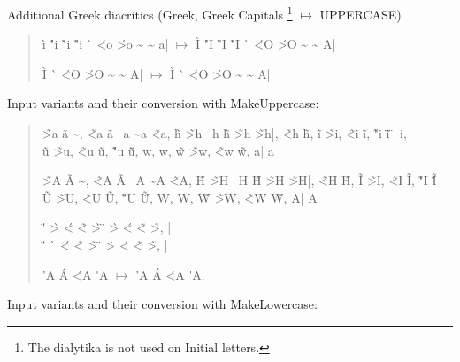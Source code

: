 \documentclass{article}
\newcommand{\LGR}{\fontencoding{LGR}\selectfont}
\newcommand{\Latin}{\fontencoding{\encodingdefault}\selectfont}
\begin{document}
Additional Greek diacritics
(Greek, Greek Capitals%
\footnote{The dialytika is not used on Initial letters.} %
$\mapsto$ UPPERCASE)

\begin{quote}
  \LGR
    \<\`{i} \'"i \`"i \~"i \` \'<{o}  \'>{o} \~ \~ a|
  $\mapsto$ \MakeUppercase{%
    \<\`{i} \'"i \`"i \~"i \` \'<{o}  \'>{o} \~ \~ a|
  }

    \<\`{I} \` \'<{O}  \'>{O} \~ \~ A|
  $\mapsto$ \MakeUppercase{%
    \<\`{I} \` \'<{O}  \'>{O} \~ \~ A|
  }
\end{quote}

\Latin Input variants and their conversion with MakeUppercase:%

\begin{quote}
\LGR

\~>a \>\~a \~, \~<a \<\~a \<~a \~\<a \~<a,
\>\~{h} \~>h \>~h \>\~h \~>h \~>h|, \~<h \<\~h,
\>\~i \~>i, \~<i \<\~i, \~"i \"\~i \"~i,\\
\>\~u \~>u, \~<u \<\~u, \~"u \"\~u,
\>w, \<w, \>\~w \~>w, \~<w \<\~w,
a| a\ypogegrammeni{}

\MakeUppercase{
\~>a \>\~a \~, \~<a \<\~a \<~a \~\<a \~<a,
\>\~{h} \~>h \>~h \>\~h \~>h \~>h|, \~<h \<\~h,
\>\~i \~>i, \~<i \<\~i, \~"i \"\~i \\ %
\>\~u \~>u, \~<u \<\~u, \~"u \"\~u,
\>w, \<w, \>\~w \~>w, \~<w \<\~w,
a| a\ypogegrammeni{}
}

\<{\textalpha} \>{\textepsilon} \"'{\textiota} \`>\texteta{}
\accvaria\accpsili\texteta{}
\'<{\textomicron} \~<{\textupsilon} \~>{\textomega}
\<{\textAlpha} \>{\textEpsilon} \"{\textIota} \`>\textEta{}
\'<{\textOmicron} \~<{\textUpsilon} \~>{\textOmega},
\textalpha| \textalpha\ypogegrammeni{}
\\
\MakeUppercase{%
  \<{\textalpha} \>{\textepsilon} \"'{\textiota} \`\>\texteta{}
  \accvaria\accpsili\texteta{}
  \'<{\textomicron} \~<{\textupsilon} \~>{\textomega}
  \<{\textAlpha} \>{\textEpsilon} \"{\textIota} \`>\textEta{}
  \'<{\textOmicron} \~<{\textUpsilon} \~>{\textOmega},
  \textalpha| \textalpha\ypogegrammeni{}
}

 \<'A \<\'A \'<A \'\<A $\mapsto$ \MakeUppercase{\<'A \<\'A \'<A \'\<A}.

\end{quote}

\Latin Input variants and their conversion with MakeLowercase:%
\end{document}
